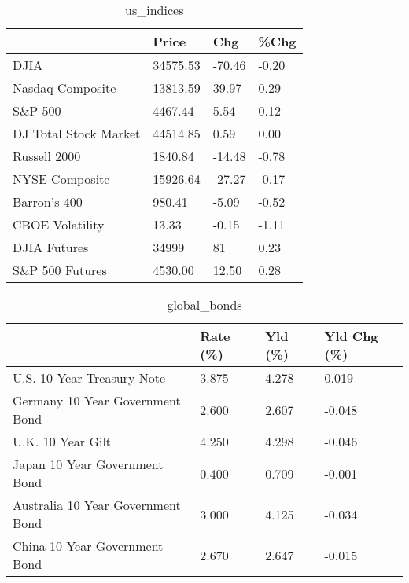 \documentclass{article}%
\begin{document}
%


\begin{table}[htbp]%
\caption{us\_indices}%
\centering%
\begin{adjustbox}{width=1\textwidth}%
\begin{tabular}{llll}
\toprule
                      &    Price &    Chg &  \%Chg \\
\midrule
                 DJIA & 34575.53 & -70.46 & -0.20 \\
     Nasdaq Composite & 13813.59 &  39.97 &  0.29 \\
              S\&P 500 &  4467.44 &   5.54 &  0.12 \\
DJ Total Stock Market & 44514.85 &   0.59 &  0.00 \\
         Russell 2000 &  1840.84 & -14.48 & -0.78 \\
       NYSE Composite & 15926.64 & -27.27 & -0.17 \\
         Barron's 400 &   980.41 &  -5.09 & -0.52 \\
      CBOE Volatility &    13.33 &  -0.15 & -1.11 \\
         DJIA Futures &    34999 &     81 &  0.23 \\
      S\&P 500 Futures &  4530.00 &  12.50 &  0.28 \\
\bottomrule
\end{tabular}
%
\end{adjustbox}%
\end{table}

%


\begin{table}[htbp]%
\caption{global\_bonds}%
\centering%
\begin{adjustbox}{width=1\textwidth}%
\begin{tabular}{llll}
\toprule
                                  & Rate (\%) & Yld (\%) & Yld Chg (\%) \\
\midrule
       U.S. 10 Year Treasury Note &    3.875 &   4.278 &       0.019 \\
  Germany 10 Year Government Bond &    2.600 &   2.607 &      -0.048 \\
                U.K. 10 Year Gilt &    4.250 &   4.298 &      -0.046 \\
    Japan 10 Year Government Bond &    0.400 &   0.709 &      -0.001 \\
Australia 10 Year Government Bond &    3.000 &   4.125 &      -0.034 \\
    China 10 Year Government Bond &    2.670 &   2.647 &      -0.015 \\
\bottomrule
\end{tabular}
%
\end{adjustbox}%
\end{table}
\end{document}
